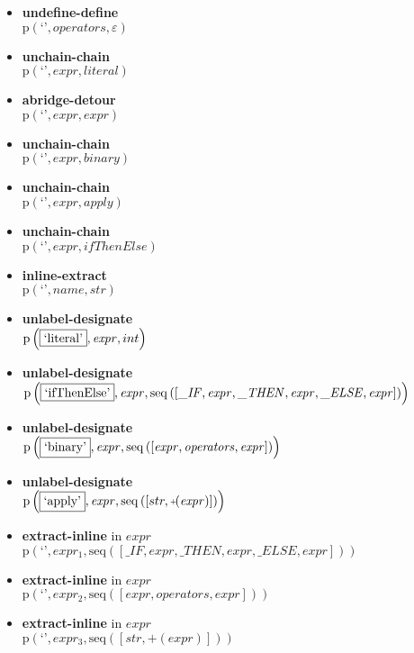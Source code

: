 {\begin{itemize}
\item \textbf{undefine-define}\\$\mathrm{p}\left(\text{`'},\mathit{operators},\varepsilon\right)$
\item \textbf{unchain-chain}\\$\mathrm{p}\left(\text{`'},\mathit{expr},\mathit{literal}\right)$
\item \textbf{abridge-detour}\\$\mathrm{p}\left(\text{`'},\mathit{expr},\mathit{expr}\right)$
\item \textbf{unchain-chain}\\$\mathrm{p}\left(\text{`'},\mathit{expr},\mathit{binary}\right)$
\item \textbf{unchain-chain}\\$\mathrm{p}\left(\text{`'},\mathit{expr},\mathit{apply}\right)$
\item \textbf{unchain-chain}\\$\mathrm{p}\left(\text{`'},\mathit{expr},\mathit{ifThenElse}\right)$
\item \textbf{inline-extract}\\$\mathrm{p}\left(\text{`'},\mathit{name},str\right)$
\item \textbf{unlabel-designate}\\$\mathrm{p}\left(\fbox{\text{`literal'}},\mathit{expr},int\right)$
\item \textbf{unlabel-designate}\\$\mathrm{p}\left(\fbox{\text{`ifThenElse'}},\mathit{expr},\mathrm{seq}\left(\left[\mathit{\_ IF}, \mathit{expr}, \mathit{\_ THEN}, \mathit{expr}, \mathit{\_ ELSE}, \mathit{expr}\right]\right)\right)$
\item \textbf{unlabel-designate}\\$\mathrm{p}\left(\fbox{\text{`binary'}},\mathit{expr},\mathrm{seq}\left(\left[\mathit{expr}, \mathit{operators}, \mathit{expr}\right]\right)\right)$
\item \textbf{unlabel-designate}\\$\mathrm{p}\left(\fbox{\text{`apply'}},\mathit{expr},\mathrm{seq}\left(\left[str, \plus \left(\mathit{expr}\right)\right]\right)\right)$
\item \textbf{extract-inline}  in $\mathit{expr}$\\$\mathrm{p}\left(\text{`'},\mathit{expr_1},\mathrm{seq}\left(\left[\mathit{\_ IF}, \mathit{expr}, \mathit{\_ THEN}, \mathit{expr}, \mathit{\_ ELSE}, \mathit{expr}\right]\right)\right)$
\item \textbf{extract-inline}  in $\mathit{expr}$\\$\mathrm{p}\left(\text{`'},\mathit{expr_2},\mathrm{seq}\left(\left[\mathit{expr}, \mathit{operators}, \mathit{expr}\right]\right)\right)$
\item \textbf{extract-inline}  in $\mathit{expr}$\\$\mathrm{p}\left(\text{`'},\mathit{expr_3},\mathrm{seq}\left(\left[str, \plus \left(\mathit{expr}\right)\right]\right)\right)$
\end{itemize}}

